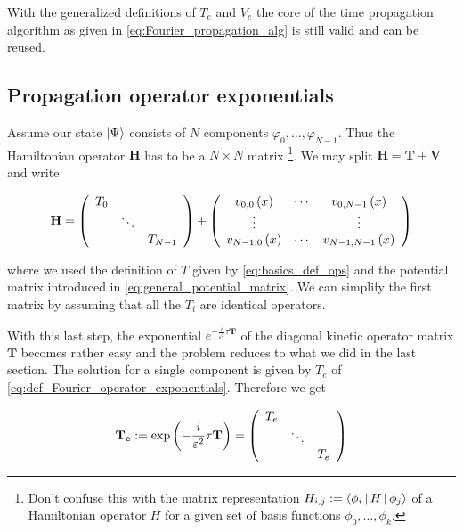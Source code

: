 With the generalized definitions of $T_e$ and $V_e$ the core of the time propagation
algorithm as given in \eqref{eq:Fourier_propagation_alg} is still valid and can be reused.


\subsection{Propagation operator exponentials}

Assume our state $\Ket{\Psi}$ consists of $N$ components $\varphi_0, \ldots, \varphi_{N-1}$.
Thus the Hamiltonian operator $\mathbf{H}$ has to be a $N \times N$ matrix
\footnote{Don't confuse this with the matrix representation $H_{i,j} := \Braket{\phi_i | H | \phi_j}$
of a Hamiltonian operator $H$ for a given set of basis functions $\phi_0, \ldots, \phi_k$.}.
We may split $\mathbf{H} = \mathbf{T} + \mathbf{V}$ and write

\begin{equation}
  \mathbf{H} =
  \left(
  \begin{array}{ccc}
    T_0  & {}     & {} \\
    {}   & \ddots & {} \\
    {}   & {}     & T_{N-1} \\
  \end{array} \right)
  +
  \left(
  \begin{array}{ccc}
    v_{0,0}\left( x \right) & \cdots & v_{0,N-1}\left( x \right) \\
    \vdots         &        & \vdots \\
    v_{N-1,0}\left( x \right) & \cdots & v_{N-1,N-1}\left( x \right)
  \end{array} \right)
\end{equation}

where we used the definition of $T$ given by \eqref{eq:basics_def_ops} and the
potential matrix introduced in \eqref{eq:general_potential_matrix}. We can simplify
the first matrix by assuming that all the $T_i$ are identical operators.

With this last step, the exponential $e^{-\frac{i}{\varepsilon^2} \tau \mathbf{T}}$
of the diagonal kinetic operator matrix $\mathbf{T}$ becomes rather easy and the
problem reduces to what we did in the last section. The solution for a single
component is given by $T_e$ of \eqref{eq:def_Fourier_operator_exponentials}.
Therefore we get

\begin{equation} \label{eq:def_Fourier_operator_exponentials_multi_T}
  \mathbf{T_e} :=
  \exp \left(  -\frac{i}{\varepsilon^2} \tau \mathbf{T}  \right)
  =
  \left(
  \begin{array}{ccc}
    T_e  & {}     & {} \\
    {}   & \ddots & {} \\
    {}   & {}     & T_e \\
  \end{array} \right)
\end{equation}

